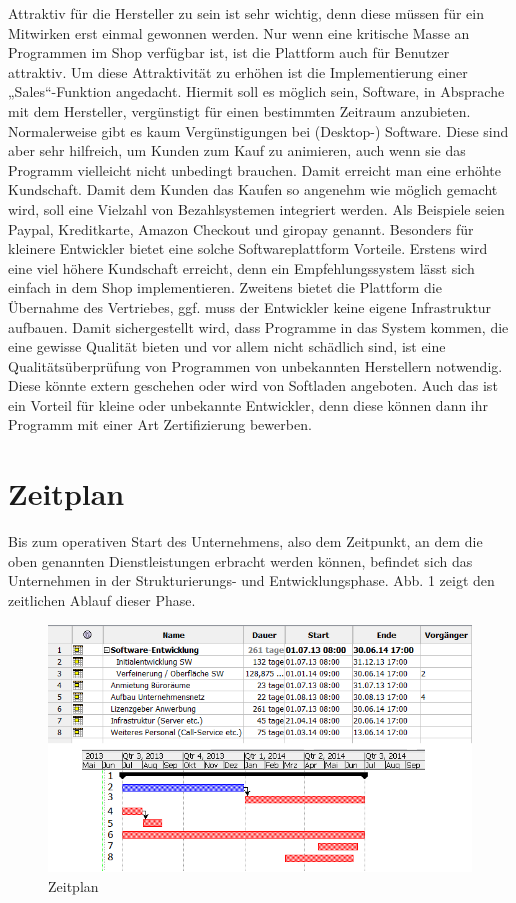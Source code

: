 Attraktiv für die Hersteller zu sein ist sehr wichtig, denn diese müssen für ein Mitwirken erst einmal gewonnen werden. 
Nur wenn eine kritische Masse an Programmen im Shop verfügbar ist, ist die Plattform auch für Benutzer attraktiv. Um diese Attraktivität zu erhöhen ist die Implementierung einer „Sales“-Funktion angedacht. Hiermit soll es möglich sein, Software, in Absprache mit dem Hersteller, vergünstigt für einen bestimmten Zeitraum anzubieten. Normalerweise gibt es kaum Vergünstigungen bei (Desktop-) Software. Diese sind aber sehr hilfreich, um Kunden zum Kauf zu animieren, auch wenn sie das Programm vielleicht nicht unbedingt brauchen. Damit erreicht man eine erhöhte Kundschaft. Damit dem Kunden das Kaufen so angenehm wie möglich gemacht wird, soll eine Vielzahl von Bezahlsystemen integriert werden. Als Beispiele seien Paypal, Kreditkarte, Amazon Checkout und giropay genannt.
Besonders für kleinere Entwickler bietet eine solche Softwareplattform Vorteile. Erstens wird eine viel höhere Kundschaft erreicht, denn ein Empfehlungssystem lässt sich einfach in dem Shop implementieren. Zweitens bietet die Plattform die Übernahme des Vertriebes, ggf. muss der Entwickler keine eigene Infrastruktur aufbauen. Damit sichergestellt wird, dass Programme in das System kommen, die eine gewisse Qualität bieten und vor allem nicht schädlich sind, ist eine Qualitätsüberprüfung von Programmen von unbekannten Herstellern notwendig. Diese könnte extern geschehen oder wird von Softladen angeboten. Auch das ist ein Vorteil für kleine oder unbekannte Entwickler, denn diese können dann ihr Programm mit einer Art Zertifizierung bewerben.
				
\section{Zeitplan}

Bis zum operativen Start des Unternehmens, also dem Zeitpunkt, an dem die oben genannten Dienstleistungen erbracht werden können, befindet sich das Unternehmen in der Strukturierungs- und Entwicklungsphase. Abb. 1 zeigt den zeitlichen Ablauf dieser  Phase.

\begin{figure}[h]
         \centering
                 \includegraphics[scale=1.00]{zeitplan.png}
                 \caption{Zeitplan}
         \label{fig:NM}
\end{figure}

